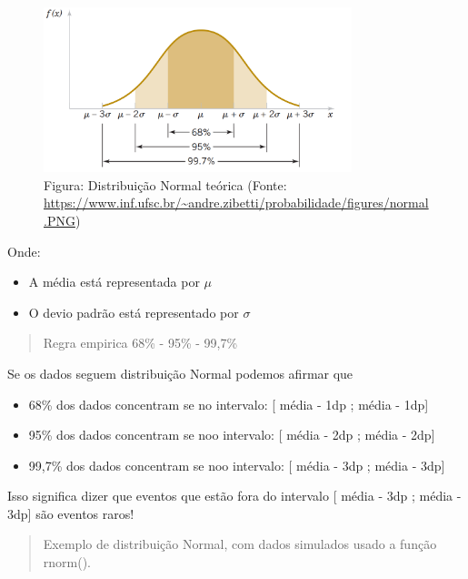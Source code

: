 \documentclass[
]{book}
\providecommand{\tightlist}{%
  \setlength{\itemsep}{0pt}\setlength{\parskip}{0pt}}
\begin{document}
\begin{figure}
\centering
\includegraphics[width=0.8\textwidth,height=\textheight]{normalTeorica.png}
\caption{Figura: Distribuição Normal teórica (Fonte: \url{https://www.inf.ufsc.br/~andre.zibetti/probabilidade/figures/normal.PNG})}
\end{figure}

Onde:

\begin{itemize}
\tightlist
\item
  A média está representada por \(\mu\)
\item
  O devio padrão está representado por \(\sigma\)
\end{itemize}

\begin{quote}
Regra empirica 68\% - 95\% - 99,7\%
\end{quote}

Se os dados seguem distribuição Normal podemos afirmar que

\begin{itemize}
\item
  68\% dos dados concentram se no intervalo: {[} média - 1dp ; média - 1dp{]}
\item
  95\% dos dados concentram se noo intervalo: {[} média - 2dp ; média - 2dp{]}
\item
  99,7\% dos dados concentram se noo intervalo: {[} média - 3dp ; média - 3dp{]}
\end{itemize}

Isso significa dizer que eventos que estão fora do intervalo {[} média - 3dp ; média - 3dp{]} são eventos raros!

\begin{quote}
Exemplo de distribuição Normal, com dados simulados usado a função rnorm().
\end{quote}
\end{document}
